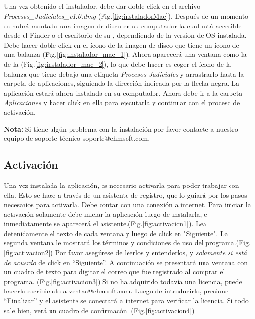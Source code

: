 \subsection{\mac}
Una vez obtenido el instalador, debe dar doble click en el archivo \emph{Procesos\_Judiciales\_v1.0.dmg} (Fig.\ref{fig:instaladorMac}). Despu\'es de un momento se habr\'a montado una imagen de disco en su computador la cual est\'a accesible desde el Finder o el escritorio de su \mac, dependiendo de la version de \mac OS instalada. Debe hacer doble click en el \'icono de la imagen de disco que tiene un \'icono de una balanza (Fig.\ref{fig:instalador_mac_1}).
Ahora aparecer\'a una ventana como la de la (Fig.\ref{fig:instalador_mac_2}), lo que debe hacer es coger el \'icono de la balanza que tiene debajo una etiqueta \emph{Procesos Judiciales} y arrastrarlo hasta la carpeta de aplicaciones, siguiendo la direcci\'on indicada por la flecha negra.
La aplicaci\'on estar\'a ahora instalada en su computador. Ahora debe ir a la carpeta \emph{Aplicaciones} y hacer click en ella para ejecutarla y continuar con el proceso de activaci\'on.

\textbf{Nota:} Si tiene alg\'un problema con la instalaci\'on por favor contacte a nuestro equipo de soporte t\'ecnico \mbox{soporte@ehmsoft.com}.
\subsection{Activaci\'on}
Una vez instalada la aplicaci\'on, es necesario activarla para poder trabajar con ella. Esto se hace a trav\'es de un asistente de registro, que lo guiar\'a por los pasos necesarios para activarla. Debe contar con una conexi\'on a internet. Para iniciar la activaci\'on solamente debe iniciar la aplicaci\'on luego de instalarla, e inmediatamente se aparecer\'a el asistente.(Fig.\ref{fig:activacion1}). Lea detenidamente el texto de cada ventana y luego de click en "Siguiente". La segunda ventana le mostrar\'a los t\'erminos y condiciones de uso del programa.(Fig.\ref{fig:activacion2}) Por favor aseg\'urese de leerlos y entenderlos, y \emph{solamente si est\'a de acuerdo} de click en ``Siguiente''. A continuaci\'on se presentar\'a una ventana con un cuadro de texto para digitar el correo que fue registrado al comprar el programa. (Fig.\ref{fig:activacion3}) Si no ha adquirido todav\'ia una licencia, puede hacerlo escribiendo a \mbox{ventas@ehmsoft.com}. Luego de introducirlo, presione ``Finalizar'' y el asistente se conectar\'a a internet para verificar la licencia. Si todo sale bien, ver\'a un cuadro de confirmac\'on. (Fig.\ref{fig:activacion4}) 

